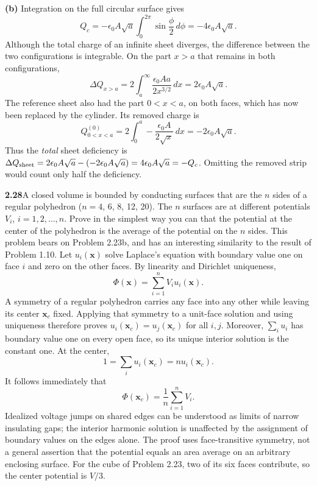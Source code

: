 \textbf{(b)} Integration on the full circular surface gives
\[
Q_c=-\epsilon _0A\sqrt a\int_0^{2\pi}\sin\frac\phi2\,d\phi
=\boxed{-4\epsilon _0A\sqrt a}.
\]
Although the total charge of an infinite sheet diverges, the
difference between the two configurations is integrable. On the
part $x>a$ that remains in both configurations,
\[
\Delta Q_{x>a}=2\int_a^\infty
  \frac{\epsilon _0Aa}{2x^{3/2}}\,dx=2\epsilon _0A\sqrt a.
\]
The reference sheet also had the part $0<x<a$, on both faces,
which has now been replaced by the cylinder. Its removed charge is
\[
Q_{0<x<a}^{(0)}=2\int_0^a-\frac{\epsilon _0A}{2\sqrt x}\,dx
=-2\epsilon _0A\sqrt a.
\]
Thus the \emph{total} sheet deficiency is
$\Delta Q_{\rm sheet}=2\epsilon _0A\sqrt a-(-2\epsilon _0A\sqrt a)
=4\epsilon _0A\sqrt a=-Q_c$.
Omitting the removed strip would count only half the deficiency.

\par\bigskip
\noindent\textbf{2.28}\quad A closed volume is bounded by conducting surfaces that are the $n$ sides of a regular polyhedron ($n=4$, 6, 8, 12, 20). The $n$ surfaces are at different potentials $V_{i}$, $i=1,2,\ldots,n$. Prove in the simplest way you can that the potential at the center of the polyhedron is the average of the potential on the $n$ sides. This problem bears on Problem 2.23b, and has an interesting similarity to the result of Problem 1.10.
\solution
Let $u_i(\mathbf x)$ solve Laplace's equation with boundary value
one on face $i$ and zero on the other faces. By linearity and
Dirichlet uniqueness,
\[
\Phi(\mathbf x)=\sum_{i=1}^nV_i u_i(\mathbf x).
\]
A symmetry of a regular polyhedron carries any face into any other
while leaving its center $\mathbf x_c$ fixed. Applying that symmetry
to a unit-face solution and using uniqueness therefore proves
$u_i(\mathbf x_c)=u_j(\mathbf x_c)$ for all $i,j$.
Moreover, $\sum_i u_i$ has boundary value one on every open face,
so its unique interior solution is the constant one. At the center,
\[
1=\sum_i u_i(\mathbf x_c)=n u_i(\mathbf x_c).
\]
It follows immediately that
\[
\boxed{\Phi(\mathbf x_c)=\frac1n\sum_{i=1}^nV_i.}
\]
Idealized voltage jumps on shared edges can be understood as limits
of narrow insulating gaps; the interior harmonic solution is
unaffected by the assignment of boundary values on the edges alone.
The proof uses face-transitive symmetry, not a general assertion
that the potential equals an area average on an arbitrary enclosing
surface. For the cube of Problem 2.23, two of its six faces contribute,
so the center potential is $V/3$.

